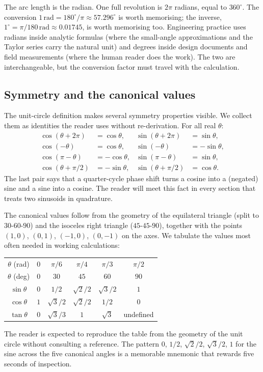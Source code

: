 

The arc length is the radian. One full revolution is $2\pi$
radians, equal to $360^{\circ}$. The conversion $1 \,\text{rad} =
180^{\circ}/\pi \approx 57.296^{\circ}$ is worth memorising; the
inverse, $1^{\circ} = \pi/180 \,\text{rad} \approx 0.01745$, is
worth memorising too. Engineering practice uses radians inside
analytic formulas (where the small-angle approximations and the
Taylor series carry the natural unit) and degrees inside design
documents and field measurements (where the human reader does the
work). The two are interchangeable, but the conversion factor must
travel with the calculation.

\subsection{Symmetry and the canonical values}

The unit-circle definition makes several symmetry properties
visible. We collect them as identities the reader uses without
re-derivation. For all real $\theta$:
\begin{align*}
\cos(\theta + 2\pi) &= \cos\theta, &
\sin(\theta + 2\pi) &= \sin\theta, \\
\cos(-\theta) &= \cos\theta, &
\sin(-\theta) &= -\sin\theta, \\
\cos(\pi - \theta) &= -\cos\theta, &
\sin(\pi - \theta) &= \sin\theta, \\
\cos(\theta + \pi/2) &= -\sin\theta, &
\sin(\theta + \pi/2) &= \cos\theta.
\end{align*}
The last pair says that a quarter-cycle phase shift turns a cosine
into a (negated) sine and a sine into a cosine. The reader will
meet this fact in every section that treats two sinusoids in
quadrature.

The canonical values follow from the geometry of the equilateral
triangle (split to $30$-$60$-$90$) and the isoceles right triangle
($45$-$45$-$90$), together with the points $(1, 0)$, $(0, 1)$,
$(-1, 0)$, $(0, -1)$ on the axes. We tabulate the values most often
needed in working calculations:
\begin{center}
\begin{tabular}{cccccc}
\toprule
$\theta$ (rad) & $0$ & $\pi/6$ & $\pi/4$ & $\pi/3$ & $\pi/2$ \\
$\theta$ (deg) & $0$ & $30$ & $45$ & $60$ & $90$ \\
\midrule
$\sin\theta$ & $0$ & $1/2$ & $\sqrt{2}/2$ & $\sqrt{3}/2$ & $1$ \\
$\cos\theta$ & $1$ & $\sqrt{3}/2$ & $\sqrt{2}/2$ & $1/2$ & $0$ \\
$\tan\theta$ & $0$ & $\sqrt{3}/3$ & $1$ & $\sqrt{3}$ & undefined \\
\bottomrule
\end{tabular}
\end{center}
The reader is expected to reproduce the table from the geometry of
the unit circle without consulting a reference. The pattern $0$,
$1/2$, $\sqrt{2}/2$, $\sqrt{3}/2$, $1$ for the sine across the five
canonical angles is a memorable mnemonic that rewards five seconds
of inspection.

